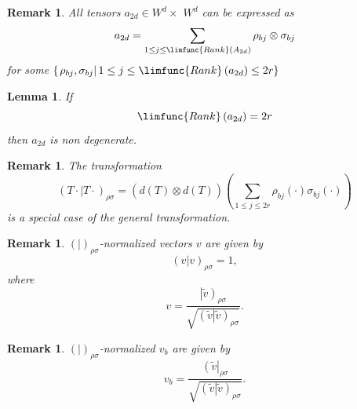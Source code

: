 \documentclass[aps,preprint]{revtex4}
\newtheorem{lemma}[theorem]{Lemma}
\newtheorem{remark}[theorem]{Remark}
\begin{document}
\begin{remark}
All tensors $a_{2d}\in W^{d}\times $ $W^{d}$ can be expressed as 
\begin{equation}
a_{2d}=\sum_{1\leq j\leq \limfunc{Rank}\left( A_{2d}\right) }\rho
_{bj}\otimes \sigma _{bj}
\end{equation}%
for some $\left\{ \left. \rho _{bj},\sigma _{bj}\right\vert 1\leq j\leq 
\limfunc{Rank}\left( a_{2d}\right) \leq 2r\right\} $
\end{remark}

\begin{lemma}
If 
\begin{equation}
\limfunc{Rank}\left( a_{2d}\right) =2r
\end{equation}%
then $a_{2d}$ is \emph{non degenerate.}
\end{lemma}

\begin{remark}
The transformation 
\begin{equation}
\left( \left. T\cdot \right\vert T\cdot \right) _{\rho \sigma }=\left( 
\overset{}{d\left( T\right) \otimes d\left( T\right) }\right) \left(
\sum_{1\leq j\leq 2r}\rho _{bj}\left( \cdot \right) \sigma _{bj}\left( \cdot
\right) \right)
\end{equation}%
is a special case of the general transformation.
\end{remark}

\begin{remark}
$\left( \left. {}\right\vert \right) _{\rho \sigma }$-normalized vectors $v$
are given by 
\begin{equation}
\left( \left. v\right\vert v\right) _{\rho \sigma }=1,
\end{equation}%
where 
\begin{equation}
v=\frac{\left\vert \widetilde{v}\right) _{\rho \sigma }}{\sqrt{\left( \left. 
\widetilde{v}\right\vert \widetilde{v}\right) _{\rho \sigma }}}.
\end{equation}
\end{remark}

\begin{remark}
$\left( \left. {}\right\vert \right) _{\rho \sigma }$-normalized $v_{b}$ are
given by 
\begin{equation}
v_{b}=\frac{\left( \widetilde{v}\right\vert _{\rho \sigma }}{\sqrt{\left(
\left. \widetilde{v}\right\vert \widetilde{v}\right) _{\rho \sigma }}}.
\end{equation}
\end{remark}
\end{document}
